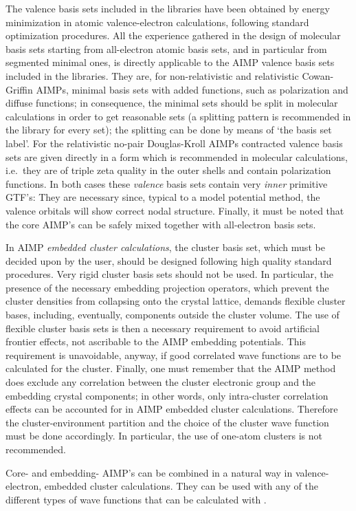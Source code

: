 The valence basis sets included in the libraries
have been obtained by energy minimization in atomic valence-electron
calculations,
following standard optimization procedures.
All the experience gathered in the design of
molecular basis sets starting from all-electron atomic basis sets,
and in particular from segmented minimal ones,
is directly applicable to the AIMP valence basis sets included in
the libraries.
They are, for non-relativistic and relativistic Cowan-Griffin AIMPs, minimal
basis sets with added functions,
such as polarization and diffuse functions;
in consequence,
the minimal sets should be split in molecular calculations
in order to get reasonable sets (a splitting pattern
is recommended in the library for every set);
the splitting can be done by means of `the basis set label'.
For the relativistic no-pair Douglas-Kroll AIMPs contracted valence basis sets
are given directly in a form which is recommended in molecular calculations,
i.e.\ they are of triple zeta quality in the outer shells and contain
polarization functions.
In both cases these {\it valence} basis sets contain very
{\it inner} primitive GTF's: They are necessary since,
typical to a model potential method,
the valence orbitals will show correct nodal structure.
Finally, it must be noted that
the core AIMP's can be safely mixed together with all-electron basis sets.

In AIMP {\it embedded cluster calculations},
the cluster basis set,
which must be decided upon by the user,
should be designed following high quality standard procedures.
Very rigid cluster basis sets should not be used.
In particular,
the presence of the necessary embedding projection operators,
which prevent the cluster densities from collapsing onto the crystal lattice,
demands flexible cluster bases, including, eventually,
components outside the cluster volume.\cite{Pascual:93}
The use of flexible cluster basis sets is then a
necessary requirement to avoid artificial frontier effects,
not ascribable to the AIMP embedding potentials.
This requirement is unavoidable, anyway, if good correlated wave
functions are to be calculated for the cluster.
Finally, one must remember that
the AIMP method does exclude any correlation between the
cluster electronic group
and the embedding crystal components; in other words, only
intra-cluster correlation effects can be accounted for in
AIMP embedded cluster calculations.
Therefore the cluster-environment partition
and the choice of the cluster wave function
must be done accordingly. In particular, the use of
one-atom clusters is not recommended.

Core- and embedding- AIMP's can be combined in a natural way
in valence-electron, embedded cluster calculations.
They can be used with any of the different types of wave
functions that can be calculated with \molcas.




